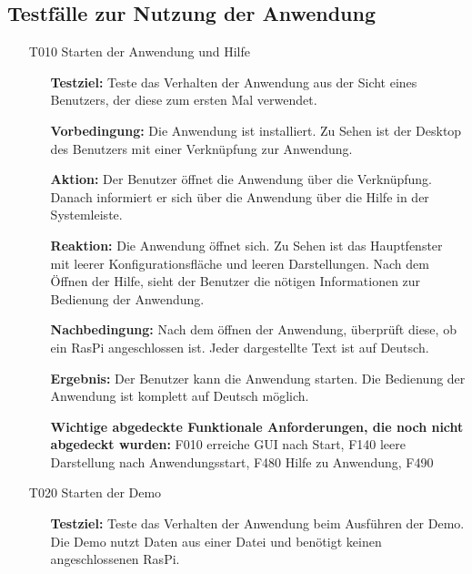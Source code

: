 \documentclass[parskip=full]{scrartcl}
\begin{document}
\subsection{Testfälle zur Nutzung der Anwendung}

\begin{itemize} 

\item[T010]Starten der Anwendung und Hilfe
\begin{itemize}

\item []\textbf{Testziel:} Teste das Verhalten der Anwendung aus der Sicht eines Benutzers, der diese zum ersten Mal verwendet.

\item []\textbf{Vorbedingung:} Die Anwendung ist installiert. Zu Sehen ist der Desktop des Benutzers mit einer Verknüpfung zur Anwendung.
\item []\textbf{Aktion:} Der Benutzer öffnet die Anwendung über die Verknüpfung. Danach informiert er sich über die Anwendung über die Hilfe in der Systemleiste.
\item []\textbf{Reaktion:} Die Anwendung öffnet sich. Zu Sehen ist das Hauptfenster mit leerer Konfigurationsfläche und leeren Darstellungen. Nach dem Öffnen der Hilfe, sieht der Benutzer die nötigen Informationen zur Bedienung der Anwendung. 
\item []\textbf{Nachbedingung:} Nach dem öffnen der Anwendung, überprüft diese, ob ein \gls{RasPi} angeschlossen ist. Jeder dargestellte Text ist auf Deutsch.

\item []\textbf{Ergebnis:} Der Benutzer kann die Anwendung starten. Die Bedienung der Anwendung ist komplett auf Deutsch möglich.
\item []\textbf{Wichtige abgedeckte Funktionale Anforderungen, die noch nicht abgedeckt wurden:} F010 erreiche GUI nach Start, F140 leere Darstellung nach Anwendungsstart, F480 Hilfe zu Anwendung, F490

\end{itemize}


\item[T020] Starten der Demo 
\begin{itemize}

\item []\textbf{Testziel:} Teste das Verhalten der Anwendung beim Ausführen der Demo. Die Demo nutzt Daten aus einer Datei und benötigt keinen angeschlossenen \gls{RasPi}.


\end{itemize}
\end{itemize}
\end{document}
